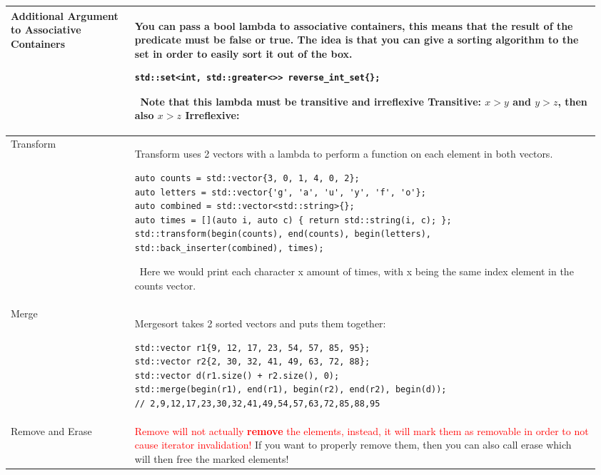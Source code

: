 \documentclass[main.tex,fontsize=8pt,paper=a4,paper=portrait,DIV=calc]{scrartcl}
\begin{document}
\begin{table}[ht!]
\begin{tabular}{|m{0.2\linewidth}|m{0.755\linewidth}|}
\hline
Additional Argument to Associative Containers & 
You can pass a bool lambda to associative containers, this means that the result of the predicate must be false or true.\newline
The idea is that you can give a sorting algorithm to the set in order to easily sort it out of the box.\newline
\begin{lstlisting}
std::set<int, std::greater<>> reverse_int_set{};
\end{lstlisting} 
\, \newline
\textcolor{OliveGreen}{Note that this lambda must be \textbf{transitive and irreflexive}}\newline
Transitive: \(x > y\) and \(y > z\), then also \(x > z\)\newline
Irreflexive: \\
\hline
Transform & 
Transform uses 2 vectors with a lambda to perform a function on each element in both vectors.\newline
\begin{lstlisting}
auto counts = std::vector{3, 0, 1, 4, 0, 2};
auto letters = std::vector{'g', 'a', 'u', 'y', 'f', 'o'};
auto combined = std::vector<std::string>{};
auto times = [](auto i, auto c) { return std::string(i, c); };
std::transform(begin(counts), end(counts), begin(letters),
std::back_inserter(combined), times);
\end{lstlisting}
\, \newline
Here we would print each character x amount of times, with x being the same index element in the counts vector.\\
\hline
Merge & 
Mergesort takes 2 sorted vectors and puts them together:\newline
\begin{lstlisting}
std::vector r1{9, 12, 17, 23, 54, 57, 85, 95};
std::vector r2{2, 30, 32, 41, 49, 63, 72, 88};
std::vector d(r1.size() + r2.size(), 0);
std::merge(begin(r1), end(r1), begin(r2), end(r2), begin(d));
// 2,9,12,17,23,30,32,41,49,54,57,63,72,85,88,95
\end{lstlisting}\\
\hline
Remove and Erase & 
\textcolor{red}{Remove will not actually \textbf{remove} the elements, instead, it will mark them as removable in order to not cause iterator invalidation!}\newline
\textcolor{OliveGreen}{If you want to properly remove them, then you can also call erase which will then free the marked elements!}\newline

\end{tabular}
\end{table}
\end{document}
